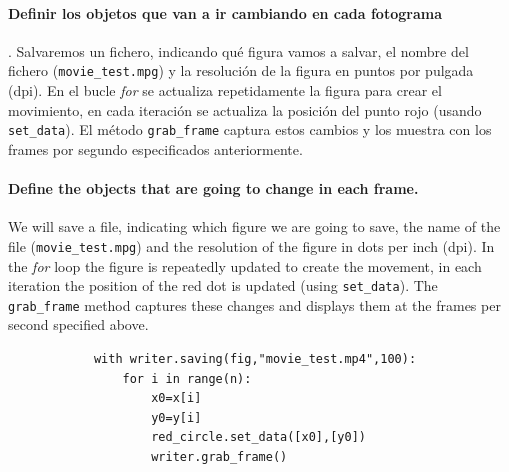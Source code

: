 \begin{paracol}{2}
    \paragraph{Definir los objetos que van a ir cambiando en cada fotograma}. Salvaremos un fichero, indicando qué figura vamos a salvar, el nombre del fichero (\texttt{movie\_test.mpg}) y la resolución de la figura en puntos por pulgada (dpi). En el bucle \textit{for} se actualiza repetidamente la figura para crear el movimiento, en cada iteración se actualiza la posición del punto rojo (usando \texttt{set\_data}). El método \texttt{grab\_frame} captura estos cambios y los muestra con los frames por segundo especificados anteriormente.
      \switchcolumn
      \paragraph{Define the objects that are going to change in each frame.} We will save a file, indicating which figure we are going to save, the name of the file (\texttt{movie\_test.mpg}) and the resolution of the figure in dots per inch (dpi). In the \textit{for} loop the figure is repeatedly updated to create the movement, in each iteration the position of the red dot is updated (using \texttt{set\_data}). The \texttt{grab\_frame} method captures these changes and displays them at the frames per second specified above.
\end{paracol}
      \begin{verbatim}
            with writer.saving(fig,"movie_test.mp4",100):
                for i in range(n):
                    x0=x[i]
                    y0=y[i]
                    red_circle.set_data([x0],[y0])
                    writer.grab_frame()
        \end{verbatim}
        
\newpage

